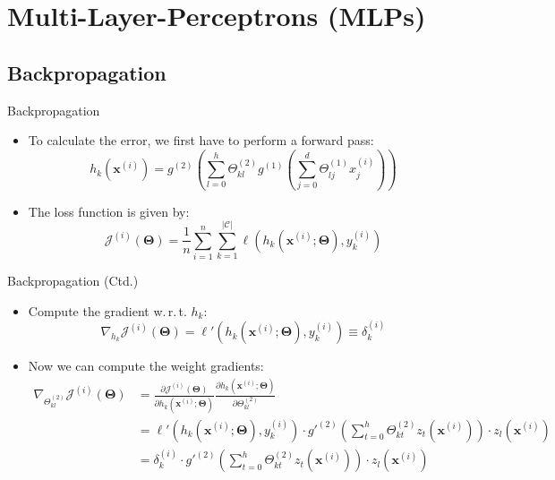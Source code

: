 \section{Multi-Layer-Perceptrons (MLPs)}

\subsection{Backpropagation}

\begin{frame}{Backpropagation}{}
	\begin{itemize}
		\item To calculate the error, we first have to perform a forward pass:
		\begin{equation*}
			h_k(\bm{x}^{(i)}) = g^{(2)}\left( \sum_{l=0}^h \Theta_{kl}^{(2)} g^{(1)}\left( \sum_{j=0}^d \Theta_{lj}^{(1)} x_{j}^{(i)} \right) \right)
		\end{equation*}
		\item The loss function is given by:
		\begin{equation*}
			\mathcal{J}^{(i)}(\bm{\Theta}) = \frac{1}{n} \sum_{i=1}^n \sum_{k=1}^{\vert \mathcal{C} \vert}
				\ell(h_k(\bm{x}^{(i)}; \bm{\Theta}), y_k^{(i)})
		\end{equation*}
	\end{itemize}
\end{frame}


\begin{frame}{Backpropagation (Ctd.)}{}
	\begin{itemize}
		\item Compute the gradient w.\,r.\,t. $h_k$:
		\begin{equation*}
			\nabla_{h_k} \mathcal{J}^{(i)}(\bm{\Theta}) = \ell'(h_k(\bm{x}^{(i)}; \bm{\Theta}), y_k^{(i)}) \equiv \delta_k^{(i)}
		\end{equation*}
		\item Now we can compute the weight gradients:
		\footnotesize
		\begin{align*}
			\nabla_{\Theta_{kl}^{(2)}} \mathcal{J}^{(i)}(\bm{\Theta})
				&= \frac{\partial \mathcal{J}^{(i)}(\bm{\Theta})}{\partial h_k(\bm{x}^{(i)}; \bm{\Theta})}
					\frac{\partial h_k(\bm{x}^{(i)}; \bm{\Theta})}{\partial \Theta_{kl}^{(2)}} \\
				&= \ell'(h_k(\bm{x}^{(i)}; \bm{\Theta}), y_k^{(i)}) \cdot g'^{(2)} \left( \sum_{t=0}^h \Theta_{kt}^{(2)} z_t(\bm{x}^{(i)}) \right)
					\cdot z_l(\bm{x}^{(i)}) \\
				&= \delta_k^{(i)} \cdot g'^{(2)} \left( \sum_{t=0}^h \Theta_{kt}^{(2)} z_t(\bm{x}^{(i)}) \right) \cdot z_l(\bm{x}^{(i)})
		\end{align*}
	\end{itemize}
\end{frame}



